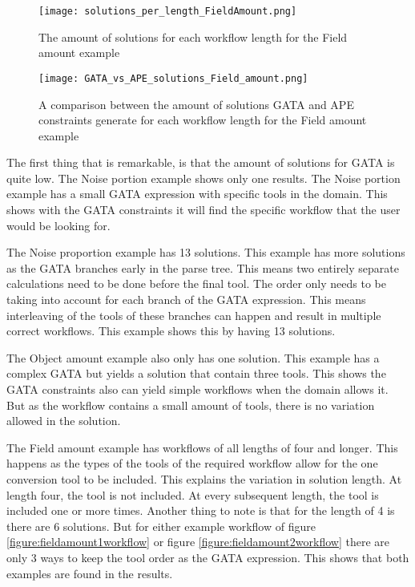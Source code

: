 \documentclass{article}
\begin{document}
\begin{figure}[H]
  \centering
    \texttt{[image: solutions\_per\_length\_FieldAmount.png]}
    \caption{The amount of solutions for each workflow length for the Field amount example}
    \label{figure:solutionsperLengthPortion}
\end{figure}
\begin{figure}[H]
  \centering
    \texttt{[image: GATA\_vs\_APE\_solutions\_Field\_amount.png]}
    \caption{A comparison between the amount of solutions  GATA and APE constraints generate for each workflow length for the Field amount example}
    \label{figure:solutionsperLengthPortion}
\end{figure}

The first thing that is remarkable, is that the amount of solutions for GATA is quite low. The Noise portion example shows only one results. The Noise portion example has a small GATA expression with specific tools in the domain. This shows with the GATA constraints it will find the specific workflow that the user would be looking for. 

The Noise proportion example has 13 solutions. This example has more solutions as the GATA branches early in the parse tree. This means two entirely separate calculations need to be done before the final tool. The order only needs to be taking into account for each branch of the GATA expression. This means interleaving of the tools of these branches can happen and result in multiple correct workflows. This example shows this by having 13 solutions. 

The Object amount example also only has one solution. This example has a complex GATA but yields a solution that contain three tools. This shows the GATA constraints also can yield simple workflows when the domain allows it. But as the workflow contains a small amount of tools, there is no variation allowed in the solution. 

The Field amount example has workflows of all lengths of four and longer. This happens as the types of the tools of the required workflow allow for the one conversion tool to be included. This explains the variation in solution length. At length four, the tool is not included. At every subsequent length, the tool is included one or more times. Another thing to note is that for the length of 4 is there are 6 solutions. But for either example workflow of figure \ref{figure:fieldamount1workflow} or figure \ref{figure:fieldamount2workflow} there are only 3 ways to keep the tool order as the GATA expression. This shows that both examples are found in the results. \\
\end{document}

